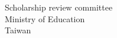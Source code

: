 \documentclass[12pt, a4paper]{simref} %
\begin{document}

\begin{letter}{
	Scholarship review committee\\
	Ministry of Education\\
	Taiwan\\
}


\begin{comment}
\opening{Dear Scholarship review committee,}

It is my pleasure to recommend M. Uliah Shafar for your scholarship program. Uliah was one of my student in master degree at Universitas Diponegoro. I had taught him few subjects of architecture and also supervised him in his thesis. While I was interacting with him, he had successfully showed courage, enthusiasm, and hard work to get his task done. In my point of view, this made him as an outstanding student. Moreover, he had proven that by graduated with highest GPA and cum laude graduate.

We have made some interaction in the class with other classmates in few subjects for nearly one semester. However, after Covid breakdown, the class should be conducted online. Although some students showed lack of interest in online class, Uliah increased his discipline, attendance and completed task punctually. He is very flexible and reliable person, no matter how different the situation are. In every class meeting, before or after Covid, Uliah always comes with groundbreaking idea, either by writing assignment, discussion or presentation. The class even more interesting, when he tried to involved by raising question, giving opinion, or commenting their classmate's ideas. He actively engaged with compassion and respect to all in his study group. His contribution to full-class discussion give clear insight both for his peers and for me as his lecturer.

In his writing task, he wrote comprehensive and accurate ideas to any other topic that was given.
He is such the best writer
even though he must catch the deadline of more than a single task weekly. The immersion in improving his writing made his one article published in national journal of urban design in early stage of education. The article that he wrote is about the public space evaluation.
This is not only show that he care only for his education but also the impact for society.


\end{comment}
\end{letter}
\end{document}
